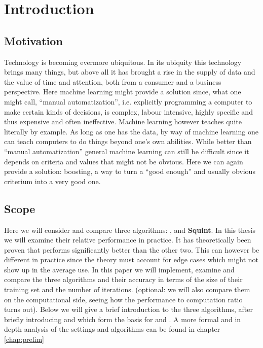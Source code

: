 
\chapter{Introduction}
\label{chap:intro}
\section{Motivation}
\label{sec:motiv}

Technology is becoming evermore ubiquitous. In its ubiquity this technology brings many things, but above all it has brought a rise in the supply of data and the value of time and attention, both from a consumer and a business perspective. Here machine learning might provide a solution since, what one might call, ``manual automatization'', i.e. explicitly programming a computer to make certain kinds of decisions, is complex, labour intensive, highly specific and thus expensive and often ineffective. Machine learning however teaches quite literally by example. As long as one has the data, by way of machine learning one can teach computers to do things beyond one's own abilities. While better than ``manual automatization'' general machine learning can still be difficult since it depends on criteria and values that might not be obvious. Here we can again provide a solution: boosting, a way to turn a ``good enough'' and usually obvious criterium into a very good one.

\section{Scope} Here we will consider and compare three algorithms: \adaB, \adaN and \textbf{Squint}. In this thesis we will examine their relative performance in practice. It has theoretically been proven that \squint performs significantly better than the other two. This can however be different in practice since the theory must account for edge cases which might not show up in the average use. In this paper we will implement, examine and compare the three algorithms and their accuracy in terms of the size of their training set and the number of iterations. {\color{red}(optional: we will also compare them on the computational side, seeing how the performance to computation ratio turns out).} Below we will give a brief introduction to the three algorithms, after briefly introducing \hedge and \weak which form the basis for \adaB and \adaN. A more formal and in depth analysis of the settings and algorithms can be found in chapter \ref{chap:prelim}

